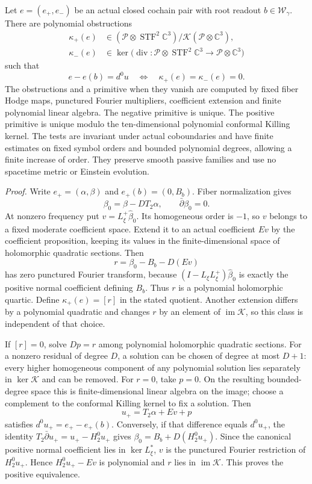 \documentclass[
  english,
  11pt,
  reqno]{amsart}
\begin{document}
Let \(e=(e_+,e_-)\) be an actual closed cochain pair with root readout
\(b\in\mathscr W_\gamma\). There are polynomial obstructions%
 \[
\begin{aligned}
\kappa_+(e)&\in
(\mathcal P\otimes\operatorname{STF}^2\mathbb C^3)
/\mathcal K(\mathcal P\otimes\mathbb C^3),\\
\kappa_-(e)&\in
\ker\bigl(\operatorname{div}:
\mathcal P\otimes\operatorname{STF}^2\mathbb C^3
\longrightarrow\mathcal P\otimes\mathbb C^3\bigr)
\end{aligned}
\] such that%
 \[
e-e(b)=d^0u
\quad\Longleftrightarrow\quad
\kappa_+(e)=\kappa_-(e)=0.
\] The obstructions and a primitive when they vanish are computed by
fixed fiber Hodge maps, punctured Fourier multipliers, coefficient
extension and finite polynomial linear algebra. The negative primitive
is unique. The positive primitive is unique modulo the ten-dimensional
polynomial conformal Killing kernel. The tests are invariant under
actual coboundaries and have finite estimates on fixed symbol orders and
bounded polynomial degrees, allowing a finite increase of order. They
preserve smooth passive families and use no spacetime metric or Einstein
evolution.

\emph{Proof.} Write \(e_+=(\alpha,\beta)\) and \(e_+(b)=(0,B_b)\). Fiber
normalization gives \[
\beta_0=\beta-DT_2\alpha,
\qquad \bar\partial\beta_0=0.
\] At nonzero frequency put \(v=L_\xi^+\widehat\beta_0\). Its
homogeneous order is \(-1\), so \(v\) belongs to a fixed moderate
coefficient space. Extend it to an actual coefficient \(Ev\) by the
coefficient proposition, keeping its values in the finite-dimensional
space of holomorphic quadratic sections. Then%
 \[
r=\beta_0-B_b-D(Ev)
\] has zero punctured Fourier transform, because
\((I-L_\xi L_\xi^+)\widehat\beta_0\) is exactly the positive normal
coefficient defining \(B_b\). Thus \(r\) is a polynomial holomorphic
quartic. Define \(\kappa_+(e)=[r]\) in the stated quotient. Another
extension differs by a polynomial quadratic and changes \(r\) by an
element of \(\operatorname{im}\mathcal K\), so this class is independent
of that choice.

If \([r]=0\), solve \(Dp=r\) among polynomial holomorphic quadratic
sections. For a nonzero residual of degree \(D\), a solution can be
chosen of degree at most \(D+1\): every higher homogeneous component of
any polynomial solution lies separately in \(\ker\mathcal K\) and can be
removed. For \(r=0\), take \(p=0\). On the resulting bounded-degree
space this is finite-dimensional linear algebra on the image; choose a
complement to the conformal Killing kernel to fix a solution. Then \[
u_+=T_2\alpha+Ev+p
\] satisfies \(d^0u_+=e_+-e_+(b)\). Conversely, if that difference
equals \(d^0u_+\), the identity \(T_2\bar\partial u_+=u_+-H_2^0u_+\)
gives \(\beta_0=B_b+D(H_2^0u_+)\). Since the canonical positive normal
coefficient lies in \(\ker L_\xi^*\), \(v\) is the punctured Fourier
restriction of \(H_2^0u_+\). Hence \(H_2^0u_+-Ev\) is polynomial and
\(r\) lies in \(\operatorname{im}\mathcal K\). This proves the positive
equivalence.
\end{document}
